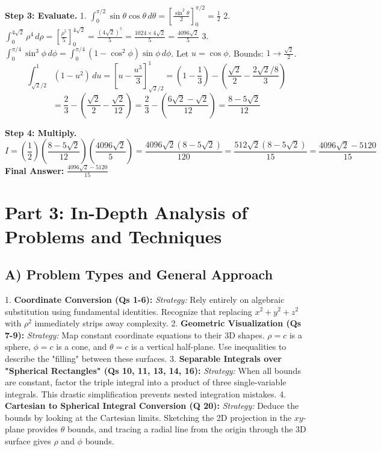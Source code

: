 \documentclass[12pt]{article}
\begin{document}
\textbf{Step 3: Evaluate.}
1. $\int_0^{\pi/2} \sin\theta \cos\theta \, d\theta = \left[ \frac{\sin^2\theta}{2} \right]_0^{\pi/2} = \frac{1}{2}$
2. $\int_0^{4\sqrt{2}} \rho^4 \, d\rho = \left[ \frac{\rho^5}{5} \right]_0^{4\sqrt{2}} = \frac{(4\sqrt{2})^5}{5} = \frac{1024 \times 4\sqrt{2}}{5} = \frac{4096\sqrt{2}}{5}$
3. $\int_0^{\pi/4} \sin^3\phi \, d\phi = \int_0^{\pi/4} (1-\cos^2\phi)\sin\phi \, d\phi$. Let $u = \cos\phi$. Bounds: $1 \to \frac{\sqrt{2}}{2}$.
\[ \int_{\sqrt{2}/2}^1 (1-u^2) \, du = \left[ u - \frac{u^3}{3} \right]_{\sqrt{2}/2}^1 = \left( 1 - \frac{1}{3} \right) - \left( \frac{\sqrt{2}}{2} - \frac{2\sqrt{2}/8}{3} \right) \]
\[ = \frac{2}{3} - \left( \frac{\sqrt{2}}{2} - \frac{\sqrt{2}}{12} \right) = \frac{2}{3} - \left( \frac{6\sqrt{2} - \sqrt{2}}{12} \right) = \frac{8 - 5\sqrt{2}}{12} \]

\textbf{Step 4: Multiply.}
\[ I = \left(\frac{1}{2}\right) \left(\frac{8 - 5\sqrt{2}}{12}\right) \left(\frac{4096\sqrt{2}}{5}\right) = \frac{4096\sqrt{2}(8 - 5\sqrt{2})}{120} = \frac{512\sqrt{2}(8 - 5\sqrt{2})}{15} = \frac{4096\sqrt{2} - 5120}{15} \]
\textbf{Final Answer:} $\frac{4096\sqrt{2} - 5120}{15}$

\newpage
\section{Part 3: In-Depth Analysis of Problems and Techniques}

\subsection{A) Problem Types and General Approach}
1. \textbf{Coordinate Conversion (Qs 1-6):} 
   \textit{Strategy:} Rely entirely on algebraic substitution using fundamental identities. Recognize that replacing $x^2+y^2+z^2$ with $\rho^2$ immediately strips away complexity.
2. \textbf{Geometric Visualization (Qs 7-9):} 
   \textit{Strategy:} Map constant coordinate equations to their 3D shapes. $\rho=c$ is a sphere, $\phi=c$ is a cone, and $\theta=c$ is a vertical half-plane. Use inequalities to describe the "filling" between these surfaces.
3. \textbf{Separable Integrals over "Spherical Rectangles" (Qs 10, 11, 13, 14, 16):} 
   \textit{Strategy:} When all bounds are constant, factor the triple integral into a product of three single-variable integrals. This drastic simplification prevents nested integration mistakes.
4. \textbf{Cartesian to Spherical Integral Conversion (Q 20):} 
   \textit{Strategy:} Deduce the bounds by looking at the Cartesian limits. Sketching the 2D projection in the $xy$-plane provides $\theta$ bounds, and tracing a radial line from the origin through the 3D surface gives $\rho$ and $\phi$ bounds.
\end{document}
